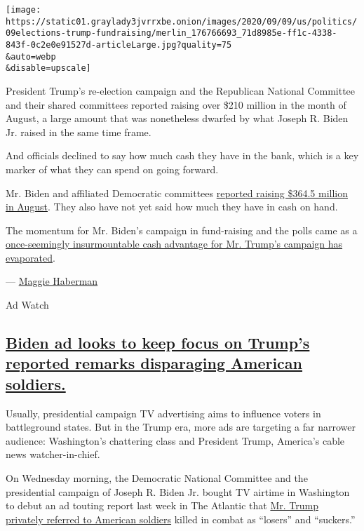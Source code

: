 \texttt{[image: https://static01.graylady3jvrrxbe.onion/images/2020/09/09/us/politics/09elections-trump-fundraising/merlin\_176766693\_71d8985e-ff1c-4338-843f-0c2e0e91527d-articleLarge.jpg?quality=75\\\&auto=webp\\\&disable=upscale]}

President Trump's re-election campaign and the Republican National
Committee and their shared committees reported raising over \$210
million in the month of August, a large amount that was nonetheless
dwarfed by what Joseph R. Biden Jr. raised in the same time frame.

And officials declined to say how much cash they have in the bank, which
is a key marker of what they can spend on going forward.

Mr. Biden and affiliated Democratic committees
\href{https://www.nytimes3xbfgragh.onion/2020/09/01/us/politics/biden-trump-fundraising-election.html}{reported
raising \$364.5 million in August}. They also have not yet said how much
they have in cash on hand.

The momentum for Mr. Biden's campaign in fund-raising and the polls came
as a
\href{https://www.nytimes3xbfgragh.onion/2020/09/07/us/politics/trump-election-campaign-fundraising.html}{once-seemingly
insurmountable cash advantage for Mr. Trump's campaign has evaporated}.

--- \href{https://www.nytimes3xbfgragh.onion/by/maggie-haberman}{Maggie
Haberman}

Ad Watch

\hypertarget{biden-ad-looks-to-keep-focus-on-trumps-reported-remarks-disparaging-american-soldiers}{%
\subsection{\texorpdfstring{\protect\hyperlink{biden-ad-looks-to-keep-focus-on-trumps-reported-remarks-disparaging-american-soldiers}{Biden
ad looks to keep focus on Trump's reported remarks disparaging American
soldiers.}}{Biden ad looks to keep focus on Trump's reported remarks disparaging American soldiers.}}\label{biden-ad-looks-to-keep-focus-on-trumps-reported-remarks-disparaging-american-soldiers}}

Usually, presidential campaign TV advertising aims to influence voters
in battleground states. But in the Trump era, more ads are targeting a
far narrower audience: Washington's chattering class and President
Trump, America's cable news watcher-in-chief.

On Wednesday morning, the Democratic National Committee and the
presidential campaign of Joseph R. Biden Jr. bought TV airtime in
Washington to debut an ad touting report last week in The Atlantic that
\href{https://www.nytimes3xbfgragh.onion/2020/09/04/us/politics/trump-veterans-losers.html}{Mr.
Trump privately referred to American soldiers} killed in combat as
``losers'' and ``suckers.''

